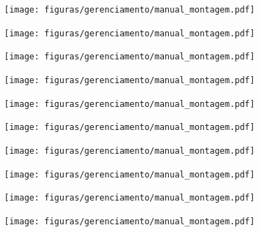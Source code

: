 \begin{apendicesenv}
\begin{figure}[H]
    \centering
    \texttt{[image: figuras/gerenciamento/manual\_montagem.pdf]}
    \label{fig:manual_montagem_14}
\end{figure}

\begin{figure}[H]
    \centering
    \texttt{[image: figuras/gerenciamento/manual\_montagem.pdf]}
    \label{fig:manual_montagem_15}
\end{figure}

\begin{figure}[H]
    \centering
    \texttt{[image: figuras/gerenciamento/manual\_montagem.pdf]}
    \label{fig:manual_montagem_16}
\end{figure}

\begin{figure}[H]
    \centering
    \texttt{[image: figuras/gerenciamento/manual\_montagem.pdf]}
    \label{fig:manual_montagem_17}
\end{figure}

\begin{figure}[H]
    \centering
    \texttt{[image: figuras/gerenciamento/manual\_montagem.pdf]}
    \label{fig:manual_montagem_18}
\end{figure}

\begin{figure}[H]
    \centering
    \texttt{[image: figuras/gerenciamento/manual\_montagem.pdf]}
    \label{fig:manual_montagem_19}
\end{figure}

\begin{figure}[H]
    \centering
    \texttt{[image: figuras/gerenciamento/manual\_montagem.pdf]}
    \label{fig:manual_montagem_20}
\end{figure}

\begin{figure}[H]
    \centering
    \texttt{[image: figuras/gerenciamento/manual\_montagem.pdf]}
    \label{fig:manual_montagem_21}
\end{figure}

\begin{figure}[H]
    \centering
    \texttt{[image: figuras/gerenciamento/manual\_montagem.pdf]}
    \label{fig:manual_montagem_22}
\end{figure}

\begin{figure}[H]
    \centering
    \texttt{[image: figuras/gerenciamento/manual\_montagem.pdf]}
    \label{fig:manual_montagem_23}
\end{figure}


\end{apendicesenv}
